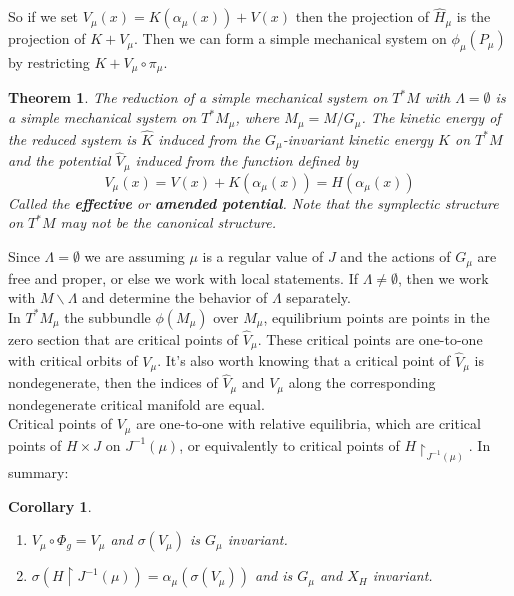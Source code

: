 \documentclass{article}
\newtheorem{thm}{Theorem}
\newtheorem{cor}{Corollary}
\begin{document}
\indent So if we set $V_{\mu}(x) = K(\alpha_{\mu}(x)) + V(x)$ then the projection of $\widehat{H}_{\mu}$ is the projection of $K+V_{\mu}$. Then we can form a simple mechanical system on $\phi_{\mu}(P_{\mu})$ by restricting $K+V_{\mu} \circ \pi_{\mu}$.

\begin{thm}
The reduction of a simple mechanical system on $T^*M$ with $\Lambda = \emptyset$ is a simple mechanical system on $T^*M_{\mu}$, where $M_{\mu} = M / G_{\mu}$. The kinetic energy of the reduced system is $\widehat{K}$ induced from the $G_{\mu}$-invariant kinetic energy $K$ on $T^*M$ and the potential $\widehat{V}_{\mu}$ induced from the function defined by 
\begin{equation}
    V_{\mu}(x) = V(x) + K(\alpha_{\mu}(x)) = H(\alpha_{\mu}(x))
\end{equation}
Called the \textbf{effective} or \textbf{amended potential}. Note that the symplectic structure on $T^*M$ may not be the canonical structure.
\end{thm}

Since $\Lambda = \emptyset$ we are assuming $\mu$ is a regular value of $J$ and the actions of $G_{\mu}$ are free and proper, or else we work with local statements. If $\Lambda \neq \emptyset$, then we work with $M \backslash \Lambda$ and determine the behavior of $\Lambda$ separately. \\
\indent In $T^*M_{\mu}$ the subbundle $\phi(M_{\mu})$ over $M_{\mu}$, equilibrium points are points in the zero section that are critical points of $\widehat{V}_{\mu}$. These critical points are one-to-one with critical orbits of $V_{\mu}$. It's also worth knowing that a critical point of $\widehat{V}_{\mu}$ is nondegenerate, then the indices of $\widehat{V}_{\mu}$ and $V_{\mu}$ along the corresponding nondegenerate critical manifold are equal. \\
\indent Critical points of $V_{\mu}$ are one-to-one with relative equilibria, which are critical points of $H \times J$ on $J^{-1}(\mu)$, or equivalently to critical points of $H \restriction_{J^{-1}(\mu)}$. In summary:

\begin{cor}\label{cor:1}
\begin{enumerate}
    \item $V_{\mu} \circ \Phi_g = V_{\mu}$ and $\sigma(V_{\mu})$ is $G_{\mu}$ invariant.
    \item $\sigma (H \restriction{J^{-1}(\mu)}) = \alpha_{\mu}(\sigma(V_{\mu}))$ and is $G_{\mu}$ and $X_H$ invariant.
\end{enumerate}
\end{cor}
\end{document}
